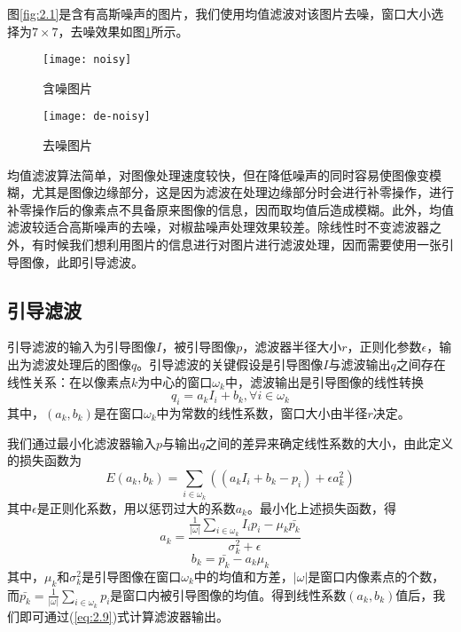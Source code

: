 \documentclass[a4paper, 12pt, oneside]{report}
\begin{document}
{图\ref{fig:2.1}是含有高斯噪声的图片，我们使用均值滤波对该图片去噪，窗口大小选择为$7\times 7$，去噪效果如图\ref{fig:2.2}所示。
\begin{figure}[H]
\centering
\begin{minipage}[t]{0.48\textwidth}
\centering
\texttt{[image: noisy]}
\caption{含噪图片}
\label{fig:2.1}
\end{minipage}
\begin{minipage}[t]{0.48\textwidth}
\centering
\texttt{[image: de-noisy]}
\caption{去噪图片}
\label{fig:2.2}
\end{minipage}
\end{figure}

均值滤波算法简单，对图像处理速度较快，但在降低噪声的同时容易使图像变模糊，尤其是图像边缘部分，这是因为滤波在处理边缘部分时会进行补零操作，进行补零操作后的像素点不具备原来图像的信息，因而取均值后造成模糊。此外，均值滤波较适合高斯噪声的去噪，对椒盐噪声处理效果较差。除线性时不变滤波器之外，有时候我们想利用图片的信息进行对图片进行滤波处理，因而需要使用一张引导图像，此即引导滤波。

\subsection{引导滤波\quad}
引导滤波的输入为引导图像$I$，被引导图像$p$，滤波器半径大小$r$，正则化参数$\epsilon$，输出为滤波处理后的图像$q$。引导滤波的关键假设是引导图像$I$与滤波输出$q$之间存在线性关系：在以像素点$k$为中心的窗口$\omega_k$中，滤波输出是引导图像的线性转换
\begin{equation} \label{eq:2.9}
q_i = a_k I_i + b_k, \forall i \in \omega_k
\end{equation}
其中，$(a_k, b_k)$是在窗口$\omega_k$中为常数的线性系数，窗口大小由半径$r$决定。

我们通过最小化滤波器输入$p$与输出$q$之间的差异来确定线性系数的大小，由此定义的损失函数为
\begin{equation} \label{eq:2.10}
E(a_k, b_k) = \sum_{i\in \omega_k}((a_k I_i + b_k - p_i) + \epsilon a_k^2)
\end{equation}
其中$\epsilon$是正则化系数，用以惩罚过大的系数$a_k$。最小化上述损失函数，得
\begin{equation} \label{eq:2.11}
a_k = \frac{\frac{1}{|\omega|}\sum_{i\in \omega_k}I_ip_i - \mu_k\bar{p_k}}{\sigma_k^2 + \epsilon}
\end{equation}
\begin{equation} \label{eq:2.12}
b_k = \bar{p_k} - a_k \mu_k
\end{equation}
其中，$\mu_k$和$\sigma_k^2$是引导图像在窗口$\omega_k$中的均值和方差，$|\omega|$是窗口内像素点的个数，而$\bar{p_k} = \frac{1}{|\omega|}\sum_{i\in \omega_k}p_i$是窗口内被引导图像的均值。得到线性系数$(a_k, b_k)$值后，我们即可通过(\ref{eq:2.9})式计算滤波器输出。

}
\end{document}

